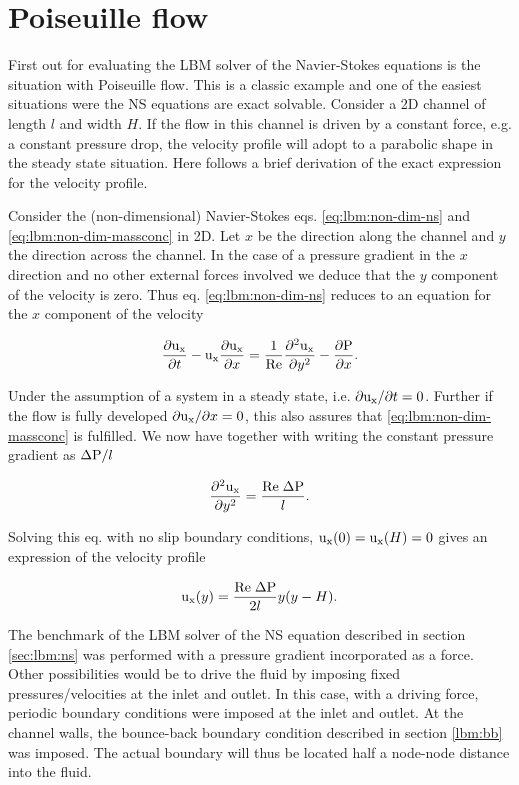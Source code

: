 \section{Poiseuille flow}
First out for evaluating the LBM solver of the Navier-Stokes equations
is the situation with Poiseuille flow. This is a classic example and
one of the easiest situations were the NS equations are exact
solvable. Consider a 2D channel of length $l$ and width $H$. If the
flow in this channel is driven by a constant force, e.g. a constant
pressure drop, the velocity profile will adopt to a parabolic shape in
the steady state situation. Here follows a brief derivation of the
exact expression for the velocity profile.

Consider the (non-dimensional) Navier-Stokes
eqs. \eqref{eq:lbm:non-dim-ns} and \eqref{eq:lbm:non-dim-massconc} in
2D. Let $x$ be the direction along the channel and $y$ the direction
across the channel. In the case of a pressure gradient in the $x$
direction and no other external forces involved we deduce that the $y$
component of the velocity is zero. Thus eq. \eqref{eq:lbm:non-dim-ns}
reduces to an equation for the $x$ component of the velocity

\begin{equation}
\dfrac{\partial \mathrm{u_x}}{\partial t} - \mathrm{u_x} \dfrac{\partial \mathrm{u_x}}{\partial
  x} = \frac{1}{\mathrm{Re}} \dfrac{\partial^2 \mathrm{u_x}}{\partial y^2} -
\dfrac{\partial \mathrm{P}}{\partial x}.
\end{equation}
 
Under the assumption of a system in a steady state, i.e. ${\partial
  \mathrm{u_x}}/{\partial t} = 0$. Further if the flow is fully developed
${\partial \mathrm{u_x}}/{\partial x} = 0$, this also assures that
\eqref{eq:lbm:non-dim-massconc} is fulfilled. We now have together
with writing the constant pressure gradient as $\Delta \mathrm{P}/l$

\begin{equation}
\dfrac{\partial^2 \mathrm{u_x}}{\partial y^2} =
\dfrac{\mathrm{Re}\; \Delta\mathrm{P}}{l}.
\end{equation}

Solving this eq. with no slip boundary conditions, $\mathrm{u_x}(0) = \mathrm{u_x}(H) =
0$ gives an expression of the velocity profile

\begin{equation}\label{eq:mb:ana_poi}
\mathrm{u_x}(y) = \dfrac{\mathrm{Re}\; \Delta\mathrm{P}}{2l}y(y - H).
\end{equation}

The benchmark of the LBM solver of the NS equation described in
section \ref{sec:lbm:ns} was performed with a pressure gradient
incorporated as a force. Other possibilities would be to drive the
fluid by imposing fixed pressures/velocities at the inlet and outlet.
In this case, with a driving force, periodic boundary conditions were
imposed at the inlet and outlet. At the channel walls, the bounce-back
boundary condition described in section \ref{lbm:bb} was imposed. The
actual boundary will thus be located half a node-node distance into
the fluid.

